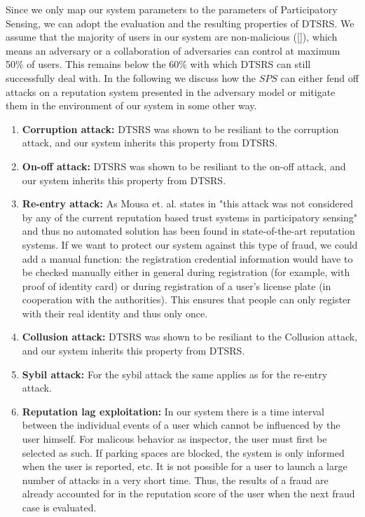 Since we only map our system parameters to the parameters of Participatory Sensing, we can adopt the evaluation and the resulting properties of DTSRS. We assume that the majority of users in our system are non-malicious (\ref{}), which means an adversary or a collaboration of adversaries can control at maximum 50\% of users. This remains below the 60\% with which DTSRS can still successfully deal with. In the following we discuss how the $SPS$ can either fend off attacks on a reputation system presented in the adversary model or mitigate them in the environment of our system in some other way.

\begin{enumerate}
\item \textbf{Corruption attack:} DTSRS was shown to be resiliant to the corruption attack, and our system inherits this property from DTSRS.
\item \textbf{On-off attack:} DTSRS was shown to be resiliant to the on-off attack, and our system inherits this property from DTSRS.
\item \textbf{Re-entry attack:} As Mousa et. al. states in \cite{mousa2015trust} "this attack was not considered by any of the current reputation based trust systems in participatory sensing" and thus no automated solution has been found in state-of-the-art reputation systems. If we want to protect our system against this type of fraud, we could add a manual function: the registration credential information would have to be checked manually either in general during registration  (for example, with proof of identity card) or during registration of a user's license plate (in cooperation with the authorities). This ensures that people can only register with their real identity and thus only once.
\item \textbf{Collusion attack:} DTSRS was shown to be resiliant to the Collusion attack, and our system inherits this property from DTSRS.
\item \textbf{Sybil attack:} For the sybil attack the same applies as for the re-entry attack.
\item \textbf{Reputation lag exploitation:} In our system there is a time interval between the individual events of a user which cannot be influenced by the user himself. For malicous behavior as inspector, the user must first be selected as such. If parking spaces are blocked, the system is only informed when the user is reported, etc. It is not possible for a user to launch a large number of attacks in a very short time. Thus, the results of a fraud are already accounted for in the reputation score of the user when the next fraud case is evaluated.

\end{enumerate}
